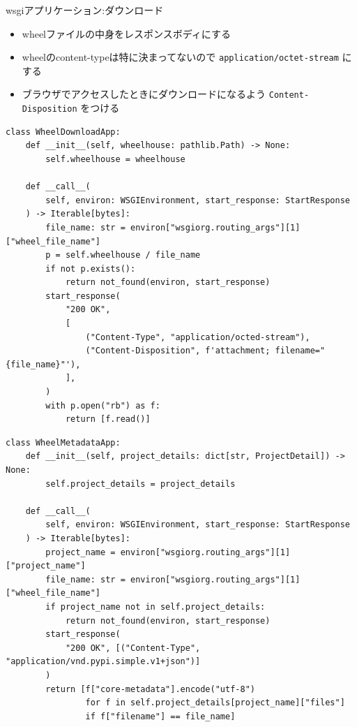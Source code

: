 \documentclass[presentation]{beamer}
\begin{document}
\begin{frame}[label={sec:org780d784},fragile]{wsgiアプリケーション:ダウンロード}
 \begin{itemize}
\item wheelファイルの中身をレスポンスボディにする
\item wheelのcontent-typeは特に決まってないので \texttt{application/octet-stream} にする
\item ブラウザでアクセスしたときにダウンロードになるよう \texttt{Content-Disposition} をつける
\end{itemize}

\begin{verbatim}
class WheelDownloadApp:
    def __init__(self, wheelhouse: pathlib.Path) -> None:
        self.wheelhouse = wheelhouse

    def __call__(
        self, environ: WSGIEnvironment, start_response: StartResponse
    ) -> Iterable[bytes]:
        file_name: str = environ["wsgiorg.routing_args"][1]["wheel_file_name"]
        p = self.wheelhouse / file_name
        if not p.exists():
            return not_found(environ, start_response)
        start_response(
            "200 OK",
            [
                ("Content-Type", "application/octed-stream"),
                ("Content-Disposition", f'attachment; filename="{file_name}"'),
            ],
        )
        with p.open("rb") as f:
            return [f.read()]

\end{verbatim}

\begin{verbatim}
class WheelMetadataApp:
    def __init__(self, project_details: dict[str, ProjectDetail]) -> None:
        self.project_details = project_details

    def __call__(
        self, environ: WSGIEnvironment, start_response: StartResponse
    ) -> Iterable[bytes]:
        project_name = environ["wsgiorg.routing_args"][1]["project_name"]
        file_name: str = environ["wsgiorg.routing_args"][1]["wheel_file_name"]
        if project_name not in self.project_details:
            return not_found(environ, start_response)
        start_response(
            "200 OK", [("Content-Type", "application/vnd.pypi.simple.v1+json")]
        )
        return [f["core-metadata"].encode("utf-8")
                for f in self.project_details[project_name]["files"]
                if f["filename"] == file_name]

\end{verbatim}
\end{frame}
\end{document}
